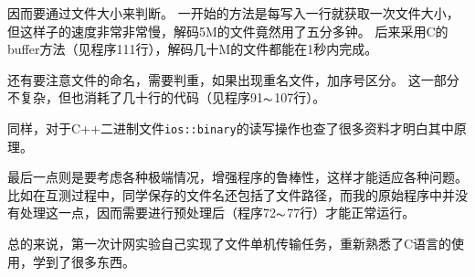 \documentclass[logo,reportComp]{thesis}
\begin{document}
因而要通过文件大小来判断。
一开始的方法是每写入一行就获取一次文件大小，但这样子的速度非常非常慢，解码5M的文件竟然用了五分多钟。
后来采用C的buffer方法（见程序111行），解码几十M的文件都能在1秒内完成。

还有要注意文件的命名，需要判重，如果出现重名文件，加序号区分。
这一部分不复杂，但也消耗了几十行的代码（见程序91$\thicksim$107行）。

同样，对于C++二进制文件\verb'ios::binary'的读写操作也查了很多资料才明白其中原理。

最后一点则是要考虑各种极端情况，增强程序的鲁棒性，这样才能适应各种问题。
比如在互测过程中，同学保存的文件名还包括了文件路径，而我的原始程序中并没有处理这一点，因而需要进行预处理后（程序72$\thicksim$77行）才能正常运行。

总的来说，第一次计网实验自己实现了文件单机传输任务，重新熟悉了C语言的使用，学到了很多东西。
\end{document}
